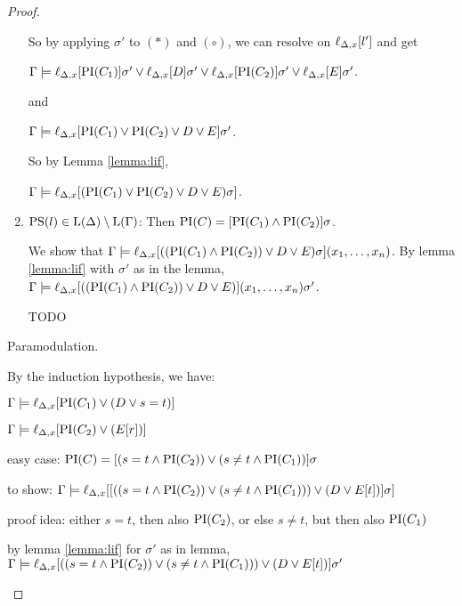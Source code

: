\documentclass[,%
	paper=a4,%
	DIV14, 
	liststotoc,
	bibtotoc,
	draft=false,%
	numbers=noendperiod
]{scrartcl}
\newcommand{\lif}[1]{\lift{\Delta}{#1}{x}}
\begin{document}
\begin{proof}
\begin{description}
\begin{enumerate}
					So by applying $\sigma'$ to $(*)$ and $(\circ)$, we can resolve on $\lif{l'}$ and get

					$\Gamma \entails \lif{\PI(C_1)}\sigma' \lor \lif D \sigma' \lor \lif{\PI(C_2)}\sigma' \lor \lif E \sigma'$.

					and

				$\Gamma \entails \lif{ \PI(C_1) \lor \PI(C_2) \lor D \lor E}\sigma' $.

				So by Lemma \ref{lemma:lif},

				$\Gamma \entails \lif{ (\PI(C_1) \lor \PI(C_2) \lor D \lor E ) \sigma } $.



				\item $\operatorname{PS}(l) \in \operatorname{L}(\Delta) \setminus \operatorname{L}(\Gamma)$:
					Then $\operatorname{PI}(C) = [\operatorname{PI}(C_1) \land \operatorname{PI}(C_2)]\sigma$. 

					We show that $\Gamma \entails \lif{((\PI(C_1) \land \PI(C_2)) \lor D \lor E)\sigma}(x_1, \ldots, x_n) $.
					By lemma \ref{lemma:lif} with $\sigma'$ as in the lemma,
					$\Gamma \entails \lif{((\PI(C_1) \land \PI(C_2)) \lor D \lor E)}(x_1, \ldots, x_n) \sigma'$.

					TODO


			\end{enumerate}

		\item{Paramodulation.}

			\begin{prooftree}
			\end{prooftree}

			By the induction hypothesis, we have:

			$\Gamma \entails \lif{\PI(C_1) \lor (D\lor s=t)}$

			$\Gamma \entails \lif{\PI(C_2) \lor (E[r])}$



			easy case:
			$\operatorname{PI}(C) = [ ( s=t \land \operatorname{PI}(C_2) ) \lor (s\neq t \land \operatorname{PI}(C_1)) ]\sigma$

			to show:
			$\Gamma \entails \lif{ [ (( s=t \land \PI(C_2) ) \lor (s\neq t \land \PI(C_1))) \lor (D \lor E[t]) ]\sigma} $

			proof idea: either $s=t$, then also $\operatorname{PI}(C_2)$, or else $s\neq t$, but then also $\operatorname{PI}(C_1)$

			by lemma \ref{lemma:lif} for $\sigma'$ as in lemma, 
			$\Gamma \entails \lif{ (( s=t \land \PI(C_2) ) \lor (s\neq t \land \PI(C_1))) \lor (D \lor E[t]) }\sigma' $


\end{description}
\end{proof}
\end{document}
